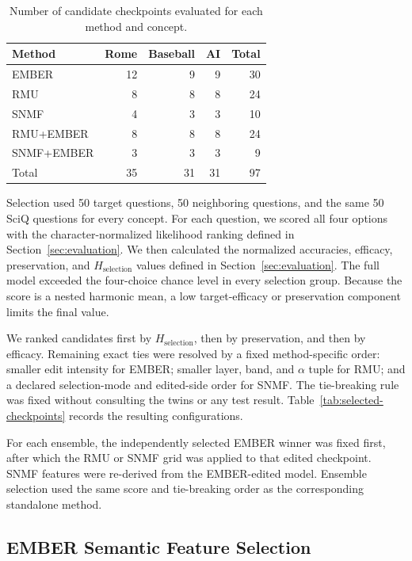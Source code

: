 \begin{table}[h]
  \centering
  \small
  \begin{tabular}{lrrrr}
    \toprule
    Method & Rome & Baseball & AI & Total \\
    \midrule
    EMBER & 12 & 9 & 9 & 30 \\
    RMU & 8 & 8 & 8 & 24 \\
    SNMF & 4 & 3 & 3 & 10 \\
    RMU+EMBER & 8 & 8 & 8 & 24 \\
    SNMF+EMBER & 3 & 3 & 3 & 9 \\
    \midrule
    Total & 35 & 31 & 31 & 97 \\
    \bottomrule
  \end{tabular}
  \caption{Number of candidate checkpoints evaluated for each method and
  concept.}
  \label{tab:selection-grid-size}
\end{table}

Selection used 50 target questions, 50 neighboring questions, and the
same 50 SciQ questions for every concept. For each question, we scored all
four options with the character-normalized likelihood ranking defined in
Section~\ref{sec:evaluation}. We then calculated the normalized accuracies,
efficacy, preservation, and $H_{\mathrm{selection}}$ values defined in
Section~\ref{sec:evaluation}. The full model exceeded the four-choice
chance level in every selection group. Because the score is a nested harmonic
mean, a low target-efficacy or preservation component limits the final value.

We ranked candidates first by $H_{\mathrm{selection}}$, then by preservation,
and then by efficacy. Remaining exact ties were resolved by a fixed
method-specific order: smaller edit intensity for EMBER; smaller layer, band,
and $\alpha$ tuple for RMU; and a declared selection-mode and edited-side order
for SNMF. The tie-breaking rule was fixed without consulting the twins or any
test result. Table~\ref{tab:selected-checkpoints} records the resulting
configurations.

For each ensemble, the independently selected EMBER winner was fixed first,
after which the RMU or SNMF grid was applied to that edited checkpoint. SNMF
features were re-derived from the EMBER-edited model. Ensemble selection used
the same score and tie-breaking order as the corresponding standalone method.

\subsection{EMBER Semantic Feature Selection}
\label{app:ember-feature-selection}

